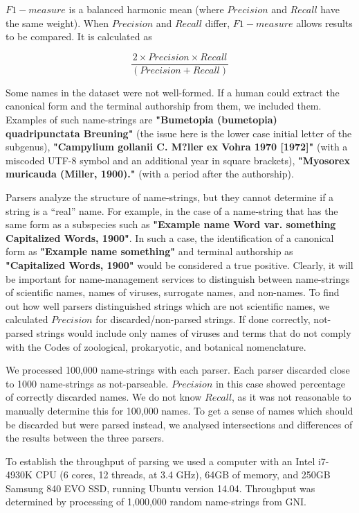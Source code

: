 \documentclass{bmcart}
\begin{document}
$F1-measure$ is a balanced harmonic mean (where $Precision$ and $Recall$ have
the same weight). When $Precision$ and $Recall$ differ, $F1-measure$ allows
results to be compared. It is calculated as

\[\dfrac{2 \times Precision \times Recall}{(Precision + Recall)}\]



Some names in the dataset were not well-formed. If a human could extract the
canonical form and the terminal authorship from them, we included them.
Examples of such name-strings are \textbf{"Bumetopia (bumetopia) quadripunctata
Breuning"} (the issue here is the lower case initial letter of the subgenus), \textbf{"Campylium
gollanii C. M?ller ex Vohra 1970 [1972]"} (with a miscoded UTF-8 symbol and an
additional year in square brackets), \textbf{"Myosorex muricauda (Miller,
1900)."} (with a period after the authorship).

Parsers analyze the structure of name-strings, but they cannot determine if
a string is a ``real'' name. For example, in the case of a name-string that has
the same form as a subspecies such as \textbf{"Example name Word var. something
Capitalized Words, 1900"}. In such a case, the identification of a canonical
form as \textbf{"Example name something"} and terminal authorship as
\textbf{"Capitalized Words, 1900"} would be considered a true positive. Clearly, it will be important for name-management services to  distinguish between name-strings of
scientific names, names of viruses, surrogate names, and non-names. To find out
how well parsers distinguished strings which are not scientific names, we
calculated $Precision$ for discarded/non-parsed strings. If done correctly,
not-parsed strings would include only names of viruses and terms that do not
comply with the Codes of zoological, prokaryotic, and botanical nomenclature.

We processed 100,000 name-strings with each parser.  Each parser discarded
close to 1000 name-strings as not-parseable.  $Precision$ in this case showed
percentage of correctly discarded names.  We do not know $Recall$, as it was
not reasonable to manually determine this for 100,000 names. To get a sense of
names which should be discarded but were parsed instead, we analysed
intersections and differences of the results between the three parsers.

To establish the throughput of parsing we used a computer with an Intel
i7-4930K CPU (6 cores, 12 threads, at 3.4 GHz), 64GB of memory, and 250GB
Samsung 840 EVO SSD, running Ubuntu version 14.04. Throughput was determined by
processing of 1,000,000 random name-strings from GNI.
\end{document}
